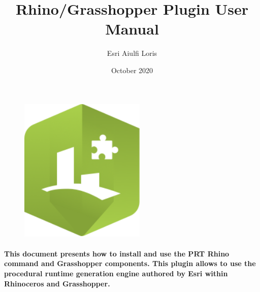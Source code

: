 \documentclass{article}
\title{Rhino/Grasshopper Plugin User Manual}
\author{Esri  Aiulfi Loris}
\date{October 2020}
\begin{document}
\begin{figure}
    \centering
    \includegraphics[width=60mm]{res/rhino_plugin_base_icon.png}
\end{figure}

\maketitle

\paragraph{This document presents how to install and use the PRT Rhino command and Grasshopper components. This plugin allows to use the procedural runtime generation engine authored by Esri within Rhinoceros and Grasshopper.}

\tableofcontents




\end{document}
